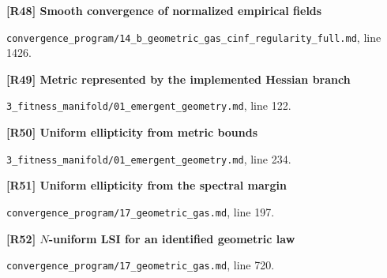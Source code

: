 \documentclass[11pt,a4paper]{article}
\begin{document}
\par\medskip\noindent\begin{minipage}{\linewidth}\textbf{[R48] Smooth convergence of normalized empirical fields}\label{src:thm-cinf-empirical-field-convergence}\par
{\small\texttt{}\par
\nolinkurl{convergence_program/14_b_geometric_gas_cinf_regularity_full.md}, line 1426.\par}
\end{minipage}\par

\par\medskip\noindent\begin{minipage}{\linewidth}\textbf{[R49] Metric represented by the implemented Hessian branch}\label{src:prop-geometry-clipped-metric}\par
{\small\texttt{}\par
\nolinkurl{3_fitness_manifold/01_emergent_geometry.md}, line 122.\par}
\end{minipage}\par

\par\medskip\noindent\begin{minipage}{\linewidth}\textbf{[R50] Uniform ellipticity from metric bounds}\label{src:thm-uniform-ellipticity-latent}\par
{\small\texttt{}\par
\nolinkurl{3_fitness_manifold/01_emergent_geometry.md}, line 234.\par}
\end{minipage}\par

\par\medskip\noindent\begin{minipage}{\linewidth}\textbf{[R51] Uniform ellipticity from the spectral margin}\label{src:thm-gg-ueph-construction}\par
{\small\texttt{}\par
\nolinkurl{convergence_program/17_geometric_gas.md}, line 197.\par}
\end{minipage}\par

\par\medskip\noindent\begin{minipage}{\linewidth}\textbf{[R52] \(N\)-uniform LSI for an identified geometric law}\label{src:thm-gg-lsi-main}\par
{\small\texttt{}\par
\nolinkurl{convergence_program/17_geometric_gas.md}, line 720.\par}
\end{minipage}\par
\end{document}
